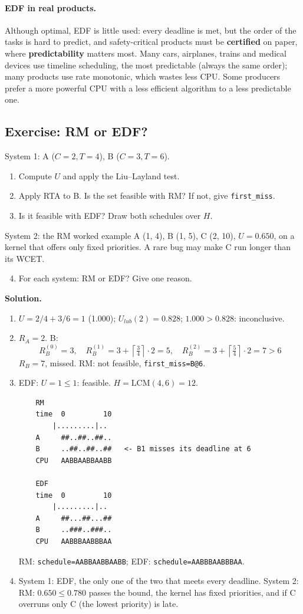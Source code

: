\paragraph{EDF in real products.} Although optimal, EDF is little used: every deadline is met, but the order of the tasks is hard to predict, and safety-critical products must be \textbf{certified} on paper, where \textbf{predictability} matters most. Many cars, airplanes, trains and medical devices use timeline scheduling, the most predictable (always the same order); many products use rate monotonic, which wastes less CPU. Some producers prefer a more powerful CPU with a less efficient algorithm to a less predictable one.

\subsection{Exercise: RM or EDF?}
System 1: A ($C = 2, T = 4$), B ($C = 3, T = 6$).
\begin{enumerate}
    \item Compute $U$ and apply the Liu--Layland test.
    \item Apply RTA to B. Is the set feasible with RM? If not, give \texttt{first\_miss}.
    \item Is it feasible with EDF? Draw both schedules over $H$.
\end{enumerate}
System 2: the RM worked example A (1, 4), B (1, 5), C (2, 10), $U = 0.650$, on a kernel that offers only fixed priorities. A rare bug may make C run longer than its WCET.
\begin{enumerate}
    \setcounter{enumi}{3}
    \item For each system: RM or EDF? Give one reason.
\end{enumerate}

\textbf{Solution.}
\begin{enumerate}
    \item $U = 2/4 + 3/6 = 1$ (1.000); $U_{lub}(2) = 0.828$; $1.000 > 0.828$: inconclusive.
    \item $R_A = 2$. B:
    \[
    R_B^{(0)} = 3, \quad R_B^{(1)} = 3 + \left\lceil \tfrac{3}{4} \right\rceil \cdot 2 = 5, \quad R_B^{(2)} = 3 + \left\lceil \tfrac{5}{4} \right\rceil \cdot 2 = 7 > 6
    \]
    $R_B = 7$, missed. RM: not feasible, \texttt{first\_miss=B@6}.
    \item EDF: $U = 1 \le 1$: feasible. $H = \mathrm{LCM}(4, 6) = 12$.
\begin{verbatim}
    RM
    time  0         10
        |.........|..
    A     ##..##..##..
    B     ..##..##..##   <- B1 misses its deadline at 6
    CPU   AABBAABBAABB

    EDF
    time  0         10
        |.........|..
    A     ##...##...##
    B     ..###..###..
    CPU   AABBBAABBBAA
\end{verbatim}
    RM: \texttt{schedule=AABBAABBAABB}; EDF: \texttt{schedule=AABBBAABBBAA}.
    \item System 1: EDF, the only one of the two that meets every deadline. System 2: RM: $0.650 \le 0.780$ passes the bound, the kernel has fixed priorities, and if C overruns only C (the lowest priority) is late.
\end{enumerate}

